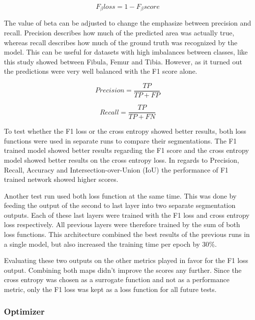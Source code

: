 \begin{equation}
F_\beta loss = 1 - F_\beta score
\end{equation}

The value of beta can be adjusted to change the emphasize between precision and recall. Precision describes how much of the predicted area was actually true, whereas recall describes how much of the ground truth was recognized by the model. This can be useful for datasets with high imbalances between classes, like this study showed between Fibula, Femur and Tibia. However, as it turned out the predictions were very well balanced with the F1 score alone.

\begin{equation}
Precision = \frac{TP}{TP+FP}
\end{equation}

\begin{equation}
Recall = \frac{TP}{TP+FN}
\end{equation}

To test whether the F1 loss or the cross entropy showed better results, both loss functions were used in separate runs to compare their segmentations. The F1 trained model showed better results regarding the F1 score and the cross entropy model showed better results on the cross entropy loss. In regards to Precision, Recall, Accuracy and Intersection-over-Union (IoU) the performance of F1 trained network showed higher scores.

Another test run used both loss function at the same time. This was done by feeding the output of the second to last layer into two separate segmentation outputs. Each of these last layers were trained with the F1 loss and cross entropy loss respectively. All previous layers were therefore trained by the sum of both loss functions. This architecture combined the best results of the previous runs in a single model, but also increased the training time per epoch by 30\%.

Evaluating these two outputs on the other metrics played in favor for the F1 loss output. Combining both maps didn't improve the scores any further. Since the cross entropy was chosen as a surrogate function and not as a performance metric, only the F1 loss was kept as a loss function for all future tests.

\subsubsection{Optimizer}

